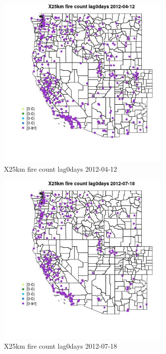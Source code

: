 \begin{figure} 
\centering  
\includegraphics[width=0.77\textwidth]{Code_Outputs/Report_ML_input_PM25_Step4_part_e_de_duplicated_aves_compiled_2019-05-14wNAs_MapObsX25km_fire_count_lag0days2012-04-12.jpg} 
\caption{\label{fig:Report_ML_input_PM25_Step4_part_e_de_duplicated_aves_compiled_2019-05-14wNAsMapObsX25km_fire_count_lag0days2012-04-12}X25km fire count lag0days 2012-04-12} 
\end{figure} 
 

\begin{figure} 
\centering  
\includegraphics[width=0.77\textwidth]{Code_Outputs/Report_ML_input_PM25_Step4_part_e_de_duplicated_aves_compiled_2019-05-14wNAs_MapObsX25km_fire_count_lag0days2012-07-18.jpg} 
\caption{\label{fig:Report_ML_input_PM25_Step4_part_e_de_duplicated_aves_compiled_2019-05-14wNAsMapObsX25km_fire_count_lag0days2012-07-18}X25km fire count lag0days 2012-07-18} 
\end{figure} 
 

